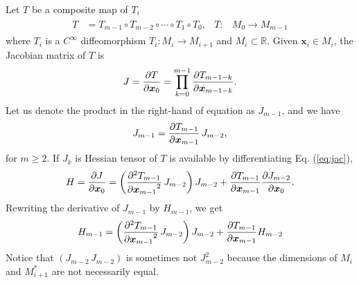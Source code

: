 \documentclass[a4paper]{article}
\newcommand{\R}{\mathbb{R}}
\newcommand{\pderiv}[3][1]{%
    \ifthenelse{\equal{#1}{1}}{\frac{\partial #2}{\partial #3}}{\frac{\partial^#1 #2}{{\partial #3}^#1}}
}
\newcommand{\jac}{J}
\newcommand{\hes}{H}
\newcommand{\parens}[1]{\left(#1\right)}
\begin{document}
Let $T$ be a composite map of $T_i$
\begin{align}
    \begin{aligned}
        T &= T_{m-1} \circ T_{m-2} \circ \cdots \circ T_1 \circ T_0,
        &
        T: & M_0 \to M_{m-1}
    \end{aligned}
    \end{align}
where $T_i$ is a $C^{\infty}$ diffeomorphism $T_i: M_i \to M_{i+1}$ and $M_i \subset \R$.
Given $\bm x_i \in M_i$, the Jacobian matrix of $T$ is
\begin{align}
    \jac = \pderiv{T}{\bm x_0} = \prod_{k=0}^{m-1} \pderiv{T_{m-1-k}}{\bm x_{m-1-k}}.
\end{align}
Let us denote the product in the right-hand of equation as $\jac_{m-1}$, and we have
\begin{align}
    \jac_{m-1} = \pderiv{T_{m-1}}{\bm x_{m-1}}\, \jac_{m-2},
    \label{eq:jac}
\end{align}
for $m \ge 2$.
If $\jac_{k}$ is
Hessian tensor of $T$ is available by differentiating Eq. (\ref{eq:jac}),
\begin{align}
    \hes = \pderiv{\jac}{\bm x_0}
    =
    \parens{
        \pderiv[2]{T_{m-1}}{\bm x_{m-1}}\,
        \jac_{m-2}
    }
    \jac_{m-2}
    +
    \pderiv{T_{m-1}}{\bm x_{m-1}}
    \pderiv{\jac_{m-2}}{\bm x_0}.
\end{align}
Rewriting the derivative of $\jac_{m-1}$ by $\hes_{m-1}$, we get
\begin{align}
    \hes_{m-1} =
    \parens{
        \pderiv[2]{T_{m-1}}{\bm x_{m-1}}\,
        \jac_{m-2}
    }
    \jac_{m-2}
    +
    \pderiv{T_{m-1}}{\bm x_{m-1}}
    \hes_{m-2}
\end{align}
Notice that $\parens{\jac_{m-2}\, \jac_{m-2}}$ is sometimes not $\jac_{m-2}^2$
because the dimensions of $M_{i}$ and $M_{i+1}^*$
are not necessarily equal.
\clearpage
\end{document}

